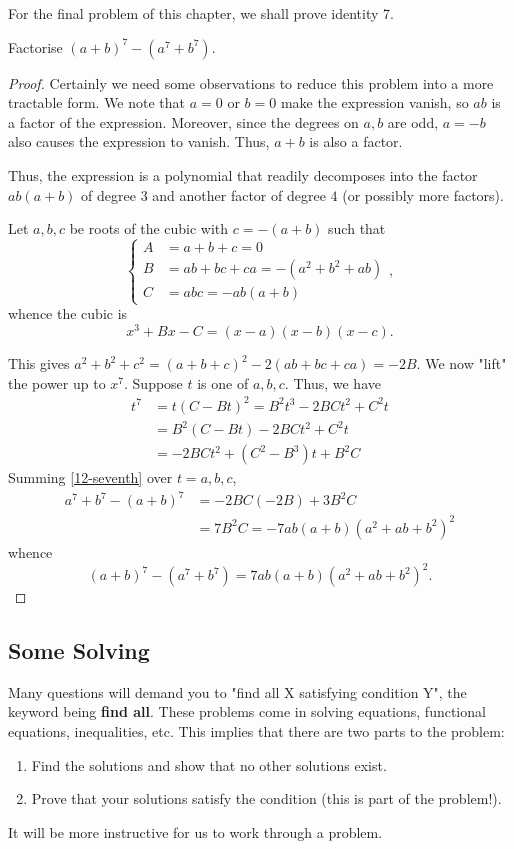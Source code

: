 \documentclass[../main.tex]{subfiles}
\begin{document}
For the final problem of this chapter, we shall prove identity 7.
\begin{example}[Classic]
    Factorise $(a+b)^7-(a^7+b^7)$.
\end{example}
\begin{proof}
    Certainly we need some observations to reduce this problem into a more tractable form. We note that $a=0$ or $b=0$ make the expression vanish, so $ab$ is a factor of the expression. Moreover, since the degrees on $a, b$ are odd, $a=-b$ also causes the expression to vanish. Thus, $a+b$ is also a factor.

    Thus, the expression is a polynomial that readily decomposes into the factor $ab(a+b)$ of degree $3$ and another factor of degree $4$ (or possibly more factors).

    Let $a,b,c$ be roots of the cubic with $c=-(a+b)$ such that
    $$\begin{cases}
        A&=a+b+c=0 \\
        B&=ab+bc+ca=-(a^2+b^2+ab) \\
        C&=abc=-ab(a+b)
    \end{cases},$$
    whence the cubic is $$x^3+Bx-C=(x-a)(x-b)(x-c).$$
    
    This gives $a^2+b^2+c^2=(a+b+c)^2-2(ab+bc+ca)=-2B$. We now "lift" the power up to $x^7$. Suppose $t$ is one of $a,b,c$. Thus, we have
    \begin{align}
        t^7&=t(C-Bt)^2=B^2t^3-2BCt^2+C^2t \\
        &=B^2(C-Bt)-2BCt^2+C^2t \\
        &=-2BCt^2+(C^2-B^3)t+B^2C \label{12-seventh}
    \end{align}
    Summing \eqref{12-seventh} over $t=a,b,c$,
    \begin{align*}
        a^7+b^7-(a+b)^7&=-2BC(-2B)+3B^2C\\
        &=7B^2C=-7ab(a+b)(a^2+ab+b^2)^2
    \end{align*}
    whence $$(a+b)^7-(a^7+b^7)=7ab(a+b)(a^2+ab+b^2)^2.$$
\end{proof}

\subsection{Some Solving}
Many questions will demand you to "find all X satisfying condition Y", the keyword being \textbf{find all}. These problems come in solving equations, functional equations, inequalities, etc. This implies that there are two parts to the problem: 
\begin{enumerate}
    \item Find the solutions and show that no other solutions exist.
    \item Prove that your solutions satisfy the condition (this is part of the problem!).
\end{enumerate}
It will be more instructive for us to work through a problem.
\end{document}

